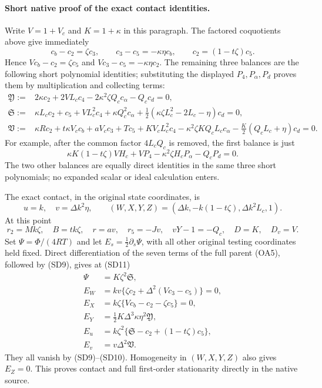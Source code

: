 \paragraph{Short native proof of the exact contact identities.}
Write $V=1+V_c$ and $K=1+\kappa$ in this paragraph. The factored
coquotients above give immediately
\[
 c_b-c_2=\zeta c_3,\qquad c_3-c_5=-\kappa\eta c_b,
 \qquad c_2=(1-t\zeta)c_5.                            \tag{SD9}
\]
Hence $Vc_b-c_2=\zeta c_5$ and
$Vc_3-c_5=-\kappa\eta c_2$.
The remaining three balances are the following short polynomial
identities; substituting the displayed $P_4,P_\alpha,P_d$ proves them
by multiplication and collecting terms:
\begin{align*}
\mathfrak Y:={}&2\kappa c_2+2VL_cc_4
                 -2\kappa^2\zeta Q_cc_\alpha-Q_cc_d=0,\\
\mathfrak S:={}&\kappa L_cc_2+c_5+VL_c^2c_4+\kappa Q_c^2c_\alpha
                 +\tfrac12(\kappa\zeta L_c^2-2L_c-\eta)c_d=0,\\
\mathfrak V:={}&\kappa Rc_2+t\kappa V_cc_b+aV_cc_3+Tc_5
 +KV_cL_c^2c_4-\kappa^2\zeta KQ_cL_cc_\alpha
 -\tfrac K2(Q_cL_c+\eta)c_d=0.                        \tag{SD10}
\end{align*}
For example, after the common factor $4L_cQ_c$ is removed,
the first balance is just
\[
 \kappa K(1-t\zeta)VH_c+VP_4
       -\kappa^2\zeta H_cP_\alpha-Q_cP_d=0.
\]
The two other balances are equally direct identities in the same three
short polynomials; no expanded scalar or ideal calculation enters.

The exact contact, in the original state coordinates, is
\[
 u=k,\quad v=\Delta k^2\eta,\qquad
 (W,X,Y,Z)=(\Delta k,-k(1-t\zeta),\Delta k^2L_c,1).      \tag{SD11}
\]
At this point
\[
 r_2=Mk\zeta,\quad B=tk\zeta,\quad r=av,\quad
 r_5=-Jv,\quad vY-1=-Q_c,\quad D=K,\quad D_v=V.
\]
Set $\Psi=\Phi/(4RT)$ and let $E_s=\tfrac12\partial_s\Psi$,
with all other original testing coordinates held fixed.
Direct differentiation of the seven terms of the full parent (OA5), followed by (SD9),
gives at (SD11)
\begin{align*}
 \Psi&=K\zeta^2\mathfrak S,\\
 E_W&=kv\{\zeta c_2+\Delta^2(Vc_3-c_5)\}=0,\\
 E_X&=k\zeta\{Vc_b-c_2-\zeta c_5\}=0,\\
 E_Y&=\tfrac12K\Delta^3\kappa\eta^2\mathfrak Y,\\
 E_u&=k\zeta^2\{\mathfrak S-c_2+(1-t\zeta)c_5\},\\
 E_v&=v\Delta^2\mathfrak V.
\end{align*}
They all vanish by (SD9)--(SD10). Homogeneity in $(W,X,Y,Z)$ also gives
$E_Z=0$. This proves contact and full first-order stationarity directly
in the native source.

